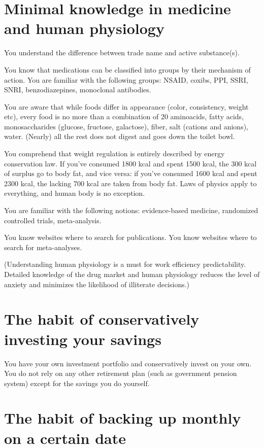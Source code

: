 \documentclass[11pt]{article}
\theoremstyle{remark}
\theoremstyle{definition}
\begin{document}
\section{Minimal knowledge in medicine and human physiology}

You understand the difference between trade name and active substance(s).

You know that medications can be classified into groups by their mechanism of action. You are familiar with the following groups: NSAID, coxibs, PPI, SSRI, SNRI, benzodiazepines, monoclonal antibodies.



You are aware that while foods differ in appearance (color, consistency, weight etc), every food is no more than a combination of 20 aminoacids, fatty acids, monosaccharides (glucose, fructose, galactose), fiber, salt (cations and anions), water. (Nearly) all the rest does not digest and goes down the toilet bowl.

You comprehend that weight regulation is entirely described by energy conservation law. If you've consumed 1800 kcal and spent 1500 kcal, the 300 kcal of surplus go to body fat, and vice versa: if you've consumed 1600 kcal and spent 2300 kcal, the lacking 700 kcal are taken from body fat. Laws of physics apply to everything, and human body is no exception.

You are familiar with the following notions: evidence-based medicine, randomized controlled trials, meta-analysis.

You know websites where to search for publications. You know websites where to search for meta-analyses.



(Understanding human physiology is a must for work efficiency predictability. Detailed knowledge of the drug market and human physiology reduces the level of anxiety and minimizes the likelihood of illiterate decisions.)




\section{The habit of conservatively investing your savings}


You have your own investment portfolio and conservatively invest on your own. You do not rely on any other retirement plan (such as government pension system) except for the savings you do yourself.


\section{The habit of backing up monthly on a certain date}
\end{document}
